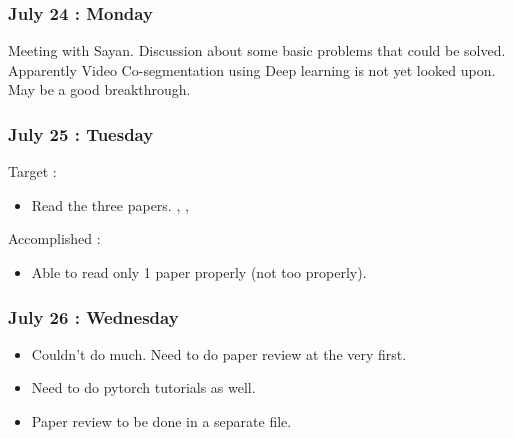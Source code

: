 \documentclass{article}
\begin{document}
\subsubsection{July 24 : Monday}
Meeting with Sayan. Discussion about some basic problems that could be solved. Apparently Video Co-segmentation using Deep learning is not yet looked upon. May be a good breakthrough.

\subsubsection{July 25 : Tuesday}
Target :
\begin{itemize}
\item Read the three papers. \cite{7120111} , \cite{7401081}, \cite{Zhang2014}
\end{itemize}

Accomplished :
\begin{itemize}
\item Able to read only 1 paper properly (not too properly).
\end{itemize}

\subsubsection{July 26 : Wednesday}

\begin{itemize}
\item Couldn't do much. Need to do paper review at the very first.
\item Need to do pytorch tutorials as well.
\item Paper review to be done in a separate file.
\end{itemize}
\end{document}
